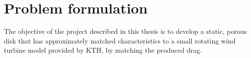\section{Problem formulation}
The objective of the project described in this thesis is to develop a static, porous disk that has approximately matched characteristics to a small rotating wind turbine model provided by KTH, by matching the produced drag. 


